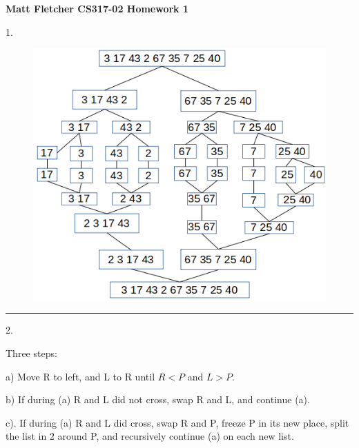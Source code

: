\documentclass{article}
\begin{document}
	

\thispagestyle{empty}

\let\oldemptyset\emptyset
\let\emptyset\varnothing


\newcommand*{\Perm}[2]{{}^{#1}\!P_{#2}}
\newcommand*{\Comb}[2]{{}_{#1}C_{#2}}


	
\textbf{	Matt Fletcher CS317-02 Homework 1}
\smallskip


1.  


\begin{figure}[H]
\includegraphics[scale=0.5]{./P1/sorted}
\centering
\end{figure}

\noindent\rule{8cm}{0.4pt}



2. 

Three steps:

a) Move R to left, and L to R until $R<P$ and $L>P$. 

b) If during (a) R and L did not cross, swap R and L, and continue (a). 

c). If during (a) R and L did cross, swap R and P, freeze P in its new place, split the list in 2 around P, and recursively continue (a) on each new list. 
\end{document}
